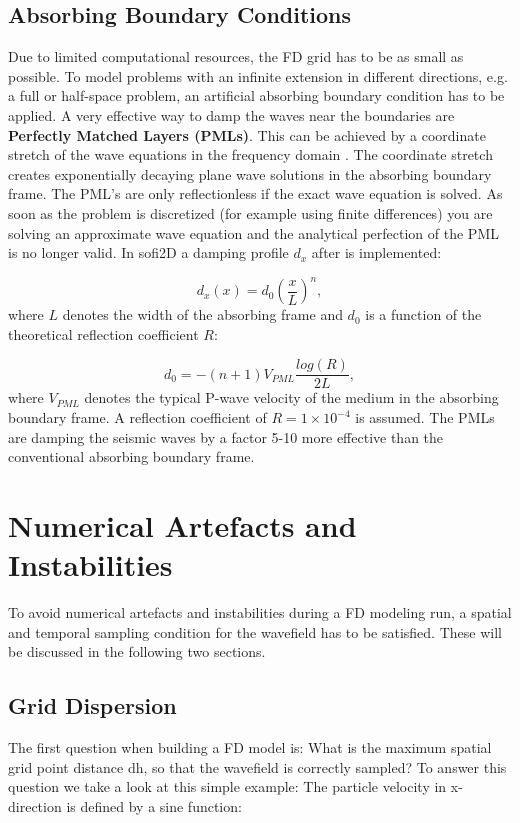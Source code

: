 \documentclass[11pt,onecolumn,oneside]{article}
\begin{document}
\subsection{Absorbing Boundary Conditions}
Due to limited computational resources, the FD grid has to be as small as possible. To model problems with an infinite extension in different directions, e.g. a full or half-space problem,  an artificial absorbing boundary condition has to be applied. A very effective way to damp the waves near the boundaries are {\bf{Perfectly Matched Layers (PMLs)}}. This can be achieved by a coordinate stretch of the wave equations in the
frequency domain \cite{komatitsch:07}. The coordinate stretch creates exponentially decaying plane wave solutions in the absorbing boundary frame. The PML's are only
reflectionless if the exact wave equation is solved. As soon as the problem is discretized (for example using finite differences) you are solving an approximate wave equation and
the analytical perfection of the PML is no longer valid. In sofi2D a damping profile $d_x$ after \cite{collino2001application} is implemented:

\begin{equation}
d_x(x)=d_0\left( \frac{x}{L}\right) ^n,
\end{equation}
where $L$ denotes the width of the absorbing frame and $d_0$ is a function of the theoretical reflection coefficient $R$:

\begin{equation}
d_0=-\left( n+1\right) V_{PML}\frac{log(R)}{2L},
\end{equation}
where $V_{PML}$ denotes the typical P-wave velocity of the medium in the absorbing boundary frame. A reflection coefficient of $R=1 \times 10^{-4}$ is assumed.
The PMLs are damping the seismic waves by a factor 5-10 more effective than the conventional absorbing boundary frame.
\clearpage
\section{Numerical Artefacts and Instabilities}\label{num_instab}
To avoid numerical artefacts and instabilities during a FD modeling run, a spatial and temporal sampling condition for the wavefield has to be satisfied. These will be discussed in the following two sections. 

\subsection{Grid Dispersion}\label{grid-dispersion}
The first question when building a FD model is: What is the maximum spatial grid point distance dh, so that the wavefield is correctly sampled? To answer this question we take a look at this simple example: The particle velocity in x-direction is defined by a sine function:
\end{document}
